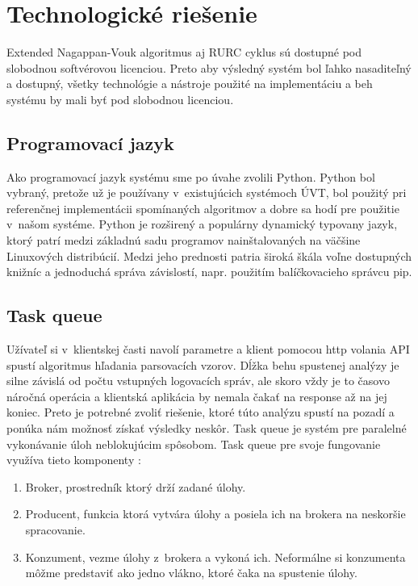 \section{Technologické riešenie}

Extended Nagappan-Vouk algoritmus aj RURC cyklus sú dostupné pod slobodnou softvérovou licenciou. Preto aby výsledný systém bol ľahko nasaditeľný a dostupný, všetky technológie a nástroje použité na implementáciu a beh systému by mali byť pod slobodnou licenciou.

\subsection{Programovací jazyk}
Ako programovací jazyk systému sme po úvahe zvolili Python. Python bol vybraný, pretože už je používany v~existujúcich systémoch ÚVT, bol použitý pri referenčnej implementácii spomínaných algoritmov a dobre sa hodí pre použitie v~našom systéme. Python je rozširený a populárny dynamický typovany jazyk, ktorý patrí medzi základnú sadu programov nainštalovaných na väčšine Linuxových distribúcií. Medzi jeho prednosti patria široká škála voľne dostupných knižníc a jednoduchá správa závislostí, napr. použitím balíčkovacieho správcu pip. 

\subsection{Task queue}
Užívateľ si v~klientskej časti navolí parametre a klient pomocou http volania API spustí algoritmus hľadania parsovacích vzorov.
Dĺžka behu spustenej analýzy je silne závislá od počtu vstupných logovacích správ, ale skoro vždy je to časovo náročná operácia a klientská aplikácia by nemala čakať na response až na jej koniec. Preto je potrebné zvoliť riešenie, ktoré túto analýzu spustí na pozadí a ponúka nám možnosť získať výsledky neskôr. Task queue je systém pre paralelné vykonávanie úloh neblokujúcim spôsobom. Task queue pre svoje fungovanie využíva tieto komponenty :

\begin{enumerate}
  \item Broker, prostredník ktorý drží zadané úlohy.
  \item Producent, funkcia ktorá vytvára úlohy a posiela ich na brokera na neskoršie spracovanie.
  \item Konzument, vezme úlohy z~brokera a vykoná ich. Neformálne si konzumenta môžme predstaviť ako jedno vlákno, ktoré čaka na spustenie úlohy.
\end{enumerate}


